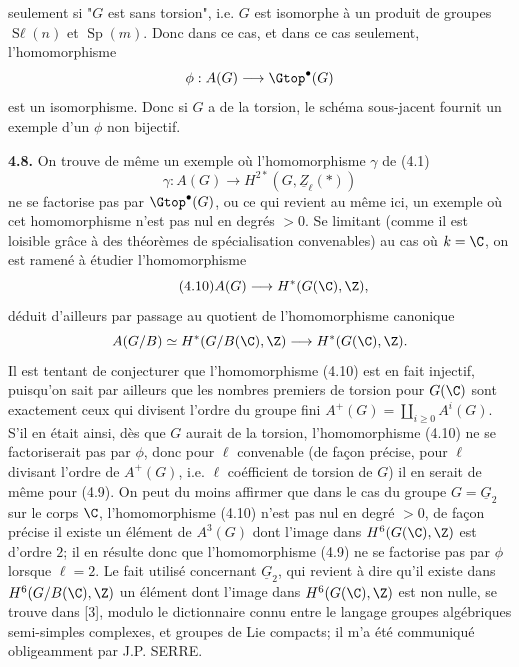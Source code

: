 
seulement si "$G$ est sans torsion", i.e. $G$ est isomorphe à un produit de groupes $\operatorname{S\ell}(n)$ et $\operatorname{Sp}(m)$. Donc dans ce cas, et dans ce cas seulement, l'homomorphisme
\[
 \phi:A(G)\longrightarrow\Gtop^\bullet(G)
\]
est un isomorphisme. Donc si $G$ a de la torsion, le schéma sous-jacent fournit un exemple d'un $\phi$ non bijectif.

\textbf{4.8.} On trouve de même un exemple où l'homomorphisme $\gamma$ de (4.1)
\begin{equation}\tag{4.9}
 \gamma:A(G)\longrightarrow H^{2*}(G,\underline{Z}_\ell(*))
\end{equation}
ne se factorise pas par $\Gtop^\bullet(G)$, ou ce qui revient au même ici, un exemple où cet homomorphisme n'est pas nul en degrés $>0$. Se limitant (comme il est loisible grâce à des théorèmes de spécialisation convenables) au cas où $k=\C$, on est ramené à étudier l'homomorphisme
\begin{equation}\tag{4.10}
 A(G)\longrightarrow H^*(G(\C),\Z),
\end{equation}
déduit d'ailleurs par passage au quotient de l'homomorphisme canonique
\[
 A(G/B)\simeq H^*(G/B(\C),\Z)\longrightarrow H^*(G(\C),\Z).
\]
Il est tentant de conjecturer que l'homomorphisme (4.10) est en fait injectif, puisqu'on sait par ailleurs que les nombres premiers de torsion pour $G(\C)$ sont exactement ceux qui divisent l'ordre du groupe fini $A^+(G)=\coprod_{i\geq0}A^i(G)$. S'il en était ainsi, dès que $G$ aurait de la torsion, l'homomorphisme (4.10) ne se factoriserait pas par $\phi$, donc pour $\ell$ convenable (de façon précise, pour $\ell$ divisant l'ordre de $A^+(G)$, i.e. $\ell$ coéfficient de torsion de $G$) il en serait de même pour (4.9). On peut du moins affirmer que dans le cas du groupe $G=\underline{G}_2$ sur le corps $\C$, l'homomorphisme (4.10) n'est pas nul en degré $>0$, de façon précise il existe un élément de $A^3(G)$ dont l'image dans $H^6(G(\C),\Z)$ est d'ordre $2$; il en résulte donc que l'homomorphisme (4.9) ne se factorise pas par $\phi$ lorsque $\ell=2$. Le fait utilisé concernant $\underline{G}_2$, qui revient à dire qu'il existe dans $H^6(G/B(\C),\Z)$ un élément dont l'image dans $H^6(G(\C),\Z)$ est non nulle, se trouve dans [3], modulo le dictionnaire connu entre le langage groupes algébriques semi-simples complexes, et groupes de Lie compacts; il m'a été communiqué obligeamment par J.P. SERRE.

